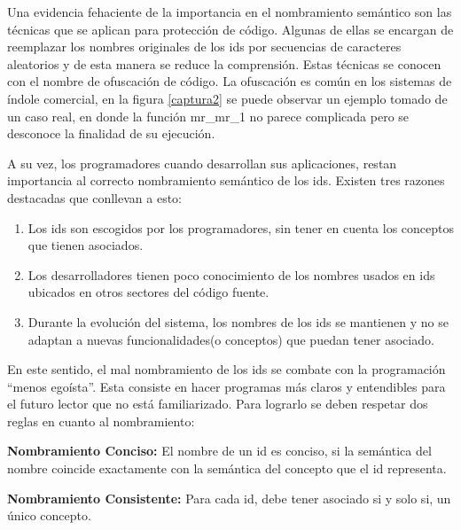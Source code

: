\documentclass[a4paper,12pt]{report}
\begin{document}




Una evidencia fehaciente de la importancia en el nombramiento semántico son las técnicas que se aplican para protección de código. Algunas de ellas se encargan de reemplazar los nombres originales de los ids por secuencias de caracteres aleatorios y de esta manera se reduce la comprensión. Estas técnicas se conocen con el nombre de ofuscación de código. La ofuscación es común en los sistemas de índole comercial, en la figura \ref{captura2} se puede observar un ejemplo tomado de un caso real, en donde la función \textsf{mr\_mr\_1} no parece complicada pero se desconoce la finalidad de su ejecución\cite{DFPM05}.

A su vez, los programadores cuando desarrollan sus aplicaciones, restan importancia al correcto nombramiento semántico de los ids. Existen tres razones destacadas que conllevan a esto:

\begin{enumerate}
\itemsep0em%
\item Los ids son escogidos por los programadores, sin tener en cuenta los conceptos que tienen asociados.

\item Los desarrolladores tienen poco conocimiento de los nombres usados en  ids ubicados en otros sectores del código fuente.

\item Durante la evolución del sistema, los nombres de los ids se mantienen y no se adaptan a nuevas funcionalidades(o conceptos) que puedan tener asociado.
\end{enumerate}

En este sentido, el mal nombramiento de los ids se combate con la programación “menos egoísta”. Esta consiste en hacer programas más claros y entendibles para el futuro lector que no está familiarizado. Para lograrlo se deben respetar dos reglas en cuanto al nombramiento\cite{DFPM05,DLHD06}:

\begin{framed}
\noindent \textbf{Nombramiento Conciso:} El nombre de un id es conciso, si la semántica del nombre coincide exactamente con la semántica del concepto que el id representa.

\noindent \textbf{Nombramiento  Consistente:} Para cada id, debe tener asociado si y solo si, un único concepto.
\end{framed}
\end{document}
